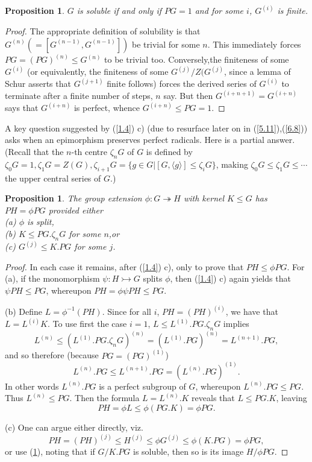 \documentclass[openany,leqno]{book}  %
\newtheorem{prop}[theorem]{Proposition}
\begin{document}
\begin{prop}\label{1.5}
$G$ is soluble if and only if $PG=1$ and for some $i$, $G^{(i)}$ is finite.
\end{prop}
\begin{proof}
The appropriate definition of solubility is that $G^{(n)}(=[G^{(n-1)},G^{(n-1)}])$ be trivial for some $n$. This immediately forces $PG=(PG)^{(n)}\leqslant G^{(n)}$ to be trivial too. Conversely,the finiteness of some $G^{(i)}$ (or equivalently, the finiteness of some $G^{(j)}/Z(G^{(j)}$, since a lemma of Schur asserts that $G^{(j+1)}$ finite follows) forces the derived series of $G^{(i)}$ to terminate after a finite number of steps, $n$ say. But then $G^{(i+n+1)}=G^{(i+n)}$ says that $G^{(i+n)}$ is perfect, whence
$G^{(i+n)}\leqslant PG=1$.
\end{proof}

A key question suggested by (\ref{1.4}) c) (due to resurface later on in (\ref{5.11}),(\ref{6.8})) asks when an epimorphism preserves perfect radicals. Here is a partial answer. (Recall that the $n$-th centre $\zeta_n G$ of $G$ is defined by $\zeta_0 G=1,\zeta_1G=Z(G),\zeta_{i+1}G=\{g\in G|[G,\langle g\rangle]\leqslant \zeta_iG\}$, making
$\zeta_0 G\leqslant \zeta_1 G\leqslant \cdots$ the upper central series of $G$.)
\begin{prop}
\label{1.6}
The group extension $\phi\colon  G\twoheadrightarrow H$ with kernel $K\leqslant G$ has $PH = \phi PG$ provided either\\
(a) $\phi$ is split,\\
(b) $K\leqslant PG.\zeta_n G$ for some $n$,or\\
(c) $G^{(j)}\leqslant K.PG$ for some $j$.
\end{prop}
\begin{proof}
In each case it remains, after (\ref{1.4}) c), only to prove that $PH \leqslant \phi PG$. For (a), if the monomorphism $\psi\colon  H\rightarrowtail G$ splits $\phi$, then (\ref{1.4}) c) again yields that $\psi PH \leqslant  PG$, whereupon $PH=\phi \psi PH\leqslant PG$.

(b) Define $L=\phi^{-1}(PH)$. Since for all $i$, $PH=(PH)^{(i)}$, we have that $L=L^{(i)}K$. To use first the case $i=1$, $L\leqslant L^{(1)}.PG.\zeta_n G$ implies
\[L^{(n)}\leqslant (L^{(1)}.PG.\zeta_n G)^{(n)}=(L^{(1)}.PG)^{(n)}=L^{(n+1)}.PG,\]
and so therefore (because $PG=(PG)^{(1)}$)
\[L^{(n)}.PG\leqslant L^{(n+1)}.PG=(L^{(n)}.PG)^{(1)}.\]
In other words $L^{(n)}.PG$ is a perfect subgroup of $G$, whereupon $L^{(n)}.PG\leqslant PG$. Thus $L^{(n)}\leqslant PG$. Then the formula $L=L^{(n)}.K$ reveals that $L\leqslant PG.K$, leaving
\[PH=\phi L\leqslant \phi(PG.K)=\phi PG.\]

(c) One can argue either directly, viz.
\[PH=(PH)^{(j)}\leqslant H^{(j)} \leqslant  \phi G^{(j)} \leqslant \phi(K.PG)=\phi PG,\]
or use (\ref{1.5}), noting that if $G/K.PG$ is soluble, then so is its image $H/\phi PG$. 
\end{proof}
\end{document}
